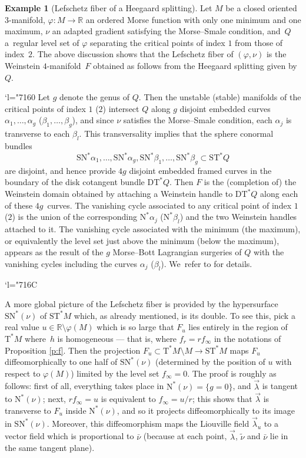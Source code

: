 \documentclass[JEP,XML,SOM,Unicode]{cedram}
\newcommand{\Changel}{\mathcode`l="7160}
\newcommand{\Changelback}{\mathcode`l="716C}
\newcommand{\R}{{\mathbb R}}
\newcommand{\etc}{,\ldots,}
\newcommand{\sN}{\mathrm{N}^\ast}
\newcommand{\sSN}{\mathrm{SN}^\ast}
\newcommand{\sT}{\mathrm{T}^\ast}
\newcommand{\sDT}{\mathrm{DT}^\ast}
\newcommand{\sST}{\mathrm{ST}^\ast}
\newcommand{\hnu}{\tilde\nu}
\newcommand{\cnu}{\bar\nu}
\let\on\colon
\theoremstyle{plain}
\theoremstyle{definition}
\newtheorem{example}{Example}
\begin{document}
\begin{example}[Lefschetz fiber of a Heegaard splitting]
Let $M$ be a closed oriented $3$-manifold, $\varphi \on M \to \R$ an ordered
Morse function with only one minimum and one maximum, $\nu$ an adapted gradient
satisfying the Morse--Smale condition, and~$Q$ a~regular level set of $\varphi$
separating the critical points of index $1$ from those of index~$2$. The above
discussion shows that the Lefschetz fiber of $(\varphi,\nu)$ is the Weinstein
$4$-manifold~$F$ obtained as follows from the Heegaard splitting given by~$Q$.

\Changel
Let $g$ denote the genus of $Q$. Then the unstable (\resp stable) manifolds of
the critical points of index $1$ (\resp $2$) intersect $Q$ along $g$ disjoint
embedded curves $\alpha_1 \etc \alpha_g$ (\resp $\beta_1 \etc \beta_g$), and
since $\nu$ satisfies the Morse--Smale condition, each $\alpha_j$ is transverse
to each $\beta_l$. This transversality implies that the sphere conormal bundles\vspace*{-3pt}\enlargethispage{.5\baselineskip}
\[
\sSN\alpha_1 \etc \sSN\alpha_g, \sSN\beta_1 \etc \sSN\beta_g
 \subset \sST Q
\]
are disjoint, and hence provide $4g$ disjoint embedded framed curves in the
boundary of the disk cotangent bundle $\sDT Q$. Then $F$ is the (completion of)
the Weinstein domain obtained by attaching a Weinstein handle to $\sDT Q$ along
each of these $4g$~curves. The vanishing cycle associated to any critical point
of index $1$ (\resp $2$) is the union of the corresponding $\sN\alpha_j$ (\resp $\sN\beta_l$) and the two Weinstein handles attached to it. The vanishing cycle
associated with the minimum (\resp the maximum), or equivalently the level set
just above the minimum (\resp below the maximum), appears as the result of the
$g$ Morse--Bott Lagrangian surgeries of $Q$ with the vanishing cycles including
the curves $\alpha_j$ (\resp $\beta_l$). We~refer to \cite{Sr} for details.
\end{example}
\Changelback

A more global picture of the Lefschetz fiber is provided by the hypersurface
$\sSN(\nu)$ of $\sST M$ which, as already mentioned, is its double. To see this,
pick a real value $u \in \R\setminus \varphi(M)$ which is so large that $F_u$ lies
entirely in the region of $\sT M$ where~$h$ is homogeneous --- that is, where
$f_r = rf_\infty$ in the notations of Proposition \ref{p:f}. Then the projection
$F_u \subset \sT M \setminus M \to \sST M$ maps $F_u$ diffeomorphically to one half of
$\sSN(\nu)$ (determined by the position of $u$ with respect to $\varphi(M)$)
limited by the level set $f_\infty = 0$. The proof is roughly as follows: first
of all, everything takes place in $\sN(\nu) = \{g=0\}$, and $\vec\lambda$ is
tangent to $\sN(\nu)$; next, $rf_\infty = u$ is equivalent to $f_\infty = u/r$;
this shows that $\vec\lambda$ is transverse to $F_u$ inside $\sN(\nu)$, and so
it projects diffeomorphically to its image in $\sSN(\nu)$. Moreover, this
diffeomorphism maps the Liouville field $\vec\lambda_u$ to a vector field which
is proportional to $\cnu$ (because at each point, $\vec\lambda$, $\hnu$ and
$\cnu$ lie in the same tangent plane).
\end{document}

